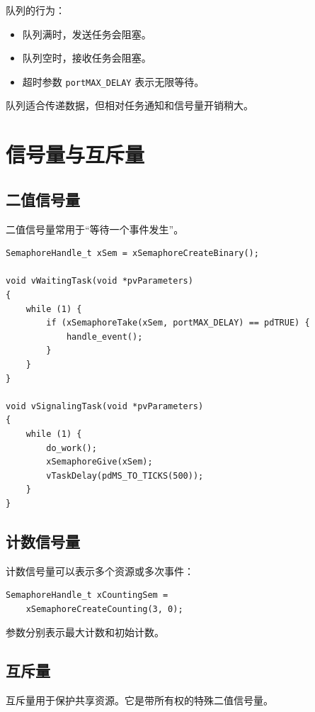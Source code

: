 \documentclass[12pt,a4paper]{ctexart}
\begin{document}
队列的行为：

\begin{itemize}
    \item 队列满时，发送任务会阻塞。
    \item 队列空时，接收任务会阻塞。
    \item 超时参数 \texttt{portMAX\_DELAY} 表示无限等待。
\end{itemize}

队列适合传递数据，但相对任务通知和信号量开销稍大。

\section{信号量与互斥量}

\subsection{二值信号量}

二值信号量常用于“等待一个事件发生”。

\begin{lstlisting}
SemaphoreHandle_t xSem = xSemaphoreCreateBinary();

void vWaitingTask(void *pvParameters)
{
    while (1) {
        if (xSemaphoreTake(xSem, portMAX_DELAY) == pdTRUE) {
            handle_event();
        }
    }
}

void vSignalingTask(void *pvParameters)
{
    while (1) {
        do_work();
        xSemaphoreGive(xSem);
        vTaskDelay(pdMS_TO_TICKS(500));
    }
}
\end{lstlisting}

\subsection{计数信号量}

计数信号量可以表示多个资源或多次事件：

\begin{lstlisting}
SemaphoreHandle_t xCountingSem =
    xSemaphoreCreateCounting(3, 0);
\end{lstlisting}

参数分别表示最大计数和初始计数。

\subsection{互斥量}

互斥量用于保护共享资源。它是带所有权的特殊二值信号量。
\end{document}
